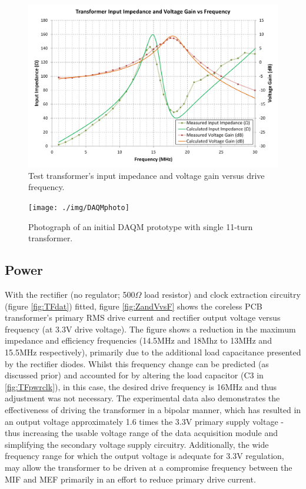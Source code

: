 \documentclass[conference]{IEEEtran}
\begin{document}
\begin{figure}[t]
	\centering
	\includegraphics[width=1.0\columnwidth]{./img/NoRectTF}
	\caption{Test transformer's input impedance and voltage gain versus drive frequency.}
	\label{fig:NoRect}
\end{figure}
%
\begin{figure}[t]
	\centering
	\texttt{[image: ./img/DAQMphoto]}
	\caption{Photograph of an initial DAQM prototype with single 11-turn transformer.}
	\label{fig:DAQMphoto}
\end{figure}

	\subsection{Power}
	With the rectifier (no regulator; 500$\Omega$ load resistor) and clock extraction circuitry (figure \ref{fig:TFdat}) fitted, figure \ref{fig:ZandVvsF} shows the coreless PCB transformer's primary RMS drive current and rectifier output voltage versus frequency (at 3.3V drive voltage).  
	The figure shows a reduction in the maximum impedance and efficiency frequencies (14.5MHz and 18Mhz to 13MHz and 15.5MHz respectively), primarily due to the additional load capacitance presented by the rectifier diodes.  Whilst this frequency change can be predicted (as discussed prior) and accounted for by altering the load capacitor (C3 in \ref{fig:TFpwrclk}), in this case, the desired drive frequency is 16MHz and thus adjustment was not necessary.  
	The experimental data also demonstrates the effectiveness of driving the transformer in a bipolar manner, which has resulted in an output voltage approximately 1.6 times the 3.3V primary supply voltage - thus increasing the usable voltage range of the data acquisition module and simplifying the secondary voltage supply circuitry.  Additionally, the wide frequency range for which the output voltage is adequate for 3.3V regulation, may allow the transformer to be driven at a compromise frequency between the MIF and MEF primarily in an effort to reduce primary drive current.
	
\end{document}
